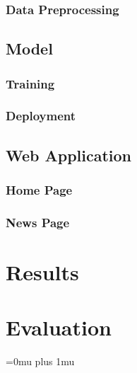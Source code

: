 \documentclass[a4paper, oneside, 11pt]{article}
\begin{document}
\begin{multicols*}{2}
  \subsubsection{Data Preprocessing}
  \lipsum[1]

  \subsection{Model}
  \lipsum[1]

  \subsubsection{Training}
  \lipsum[1]

  \subsubsection{Deployment}
  \lipsum[1]

  \subsection{Web Application}

  \subsubsection{Home Page} 
  \lipsum[1]


  \subsubsection{News Page}
  \lipsum[1]


  
  \section{Results}
  


  
  \section{Evaluation}
  \lipsum[1]



  \newpage


  \Urlmuskip=0mu plus 1mu\relax
  
  

\end{multicols*}
\end{document}
